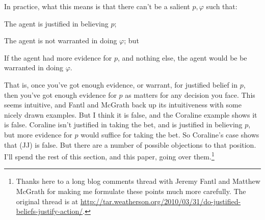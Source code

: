 \noindent In practice, what this means is that there can't be a salient $p, \varphi$ such that:

\begin{itemize*}
\item The agent is justified in believing $p$;
\item The agent is not warranted in doing $\varphi$; but
\item If the agent had more evidence for $p$, and nothing else, the agent would be be warranted in doing $\varphi$.
\end{itemize*}

\noindent That is, once you've got enough evidence, or warrant, for justified belief in $p$, then you've got enough evidence for $p$ as matters for any decision you face. This seems intuitive, and Fantl and McGrath back up its intuitiveness with some nicely drawn examples. But I think it is false, and the Coraline example shows it is false. Coraline isn't justified in taking the bet, and is justified in believing $p$, but more evidence for $p$ would suffice for taking the bet. So Coraline's case shows that (JJ) is false. But there are a number of possible objections to that position. I'll spend the rest of this section, and this paper, going over them.\footnote{Thanks here to a long blog comments thread with Jeremy Fantl and Matthew McGrath for making me formulate these points much more carefully. The original thread is at \url{http://tar.weatherson.org/2010/03/31/do-justified-beliefs-justify-action/}.}


